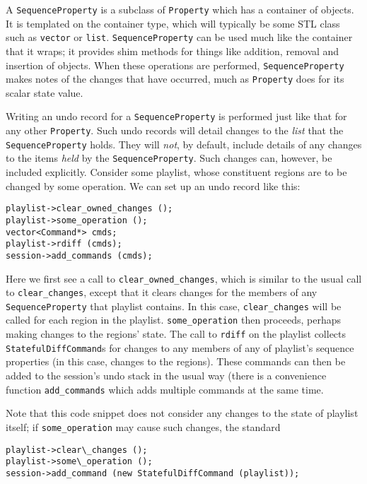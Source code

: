 \documentclass[10pt,a4paper]{book}
\newcommand{\code}[1]{\texttt{#1}}
\begin{document}
A \code{SequenceProperty} is a subclass of \code{Property} which has a
container of objects.  It is templated on the container type, which
will typically be some STL class such as \code{vector} or \code{list}.
\code{SequenceProperty} can be used much like the container that it
wraps; it provides shim methods for things like addition, removal and
insertion of objects.  When these operations are performed,
\code{SequenceProperty} makes notes of the changes that have occurred,
much as \code{Property} does for its scalar state value.

Writing an undo record for a \code{SequenceProperty} is performed just
like that for any other \code{Property}.  Such undo records will
detail changes to the \emph{list} that the \code{SequenceProperty}
holds.  They will \emph{not}, by default, include details of any
changes to the items \emph{held} by the \code{SequenceProperty}.  Such
changes can, however, be included explicitly.  Consider some playlist,
whose constituent regions are to be changed by some operation.  We can
set up an undo record like this:

\begin{lstlisting}
playlist->clear_owned_changes ();
playlist->some_operation ();
vector<Command*> cmds;
playlist->rdiff (cmds);
session->add_commands (cmds);
\end{lstlisting}

Here we first see a call to \code{clear\_owned\_changes}, which is
similar to the usual call to \code{clear\_changes}, except that it
clears changes for the members of any \code{SequenceProperty} that
playlist contains.  In this case, \code{clear\_changes} will be called
for each region in the playlist.  \code{some\_operation} then
proceeds, perhaps making changes to the regions' state.  The call to
\code{rdiff} on the playlist collects \code{StatefulDiffCommand}s for
changes to any members of any of playlist's sequence properties (in
this case, changes to the regions).  These commands can then be added
to the session's undo stack in the usual way (there is a convenience
function \code{add\_commands} which adds multiple commands at the
same time.

Note that this code snippet does not consider any changes to the state
of playlist itself; if \code{some\_operation} may cause such changes,
the standard

\begin{lstlisting}
playlist->clear\_changes ();
playlist->some\_operation ();
session->add_command (new StatefulDiffCommand (playlist));
\end{lstlisting}
\end{document}
